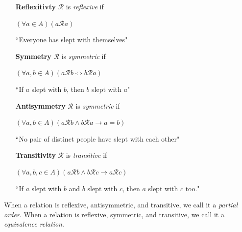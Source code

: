\documentclass{article}
\begin{document}
    \begin{enumerate}[align=left]
        \item [\textbf{Reflexitivty}] $\mathcal{R}$ is \textit{reflexive} if 

        $(\forall a \in A)(a\mathcal{R}a)$

        ``Everyone has slept with themselves"
        \item [\textbf{Symmetry}] $\mathcal{R}$ is \textit{symmetric} if 

        $(\forall a, b \in A)(a\mathcal{R}b \iff b\mathcal{R}a)$

        ``If $a$ slept with $b$, then $b$ slept with $a$"

        \item [\textbf{Antisymmetry}] $\mathcal{R}$ is \textit{symmetric} if 

        $(\forall a, b\in A)(a\mathcal{R}b \wedge b\mathcal{R}a \rightarrow a=b)$

        ``No pair of distinct people have slept with each other"

        \item [\textbf{Transitivity}] $\mathcal{R}$ is \textit{transitive} if 

        $(\forall a, b, c\in A)(a\mathcal{R}b \wedge b\mathcal{R}c \rightarrow a\mathcal{R}c)$

        ``If $a$ slept with $b$ and $b$ slept with $c$, then $a$ slept with $c$ too."
    \end{enumerate}

    When a relation is reflexive, antisymmetric, and transitive, we call it a \textit{partial order}. When a relation is reflexive, symmetric, and transitive, we call it a \textit{equivalence relation}.
\end{document}
